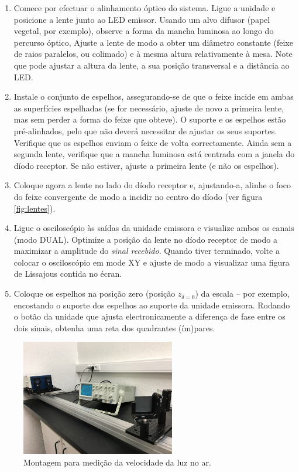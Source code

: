 \documentclass[a4paper,twoside,11pt]{report}      %
\begin{document}
\begin{enumerate}
\setlength{\itemsep}{0mm}
\item Comece por efectuar o alinhamento óptico do sistema. Ligue a unidade e posicione a lente junto ao LED emissor. Usando um alvo difusor (papel vegetal, por exemplo), observe a forma da mancha luminosa ao longo do percurso óptico, Ajuste a lente de modo a obter um diâmetro constante (feixe de raios paralelos, ou colimado) e à mesma altura relativamente à mesa. Note que pode ajustar a altura da lente, a sua posição transversal e a distância ao LED.
\item Instale o conjunto de espelhos, assegurando-se de que o feixe incide em ambas as superfícies espelhadas (se for necessário, ajuste de novo a primeira lente, mas sem perder a forma do feixe que obteve). O suporte e os espelhos estão pré-alinhados, pelo que não deverá necessitar de ajustar os seus suportes. Verifique que os espelhos enviam o feixe de volta correctamente. Ainda sem a segunda lente, verifique que a mancha luminosa está centrada com  a janela do díodo receptor. Se não estiver, ajuste a primeira lente (e não os espelhos).
\item Coloque agora a lente no lado do díodo receptor e, ajustando-a, alinhe o foco do feixe convergente de modo a incidir no centro do díodo (ver figura \ref{fig:lentes}).
\item Ligue o osciloscópio às saídas da unidade emissora e visualize ambos os canais (modo DUAL). Optimize a posição da lente no díodo receptor de modo a maximizar a amplitude do \emph{sinal recebido}. Quando tiver terminado, volte a colocar o osciloscópio em mode XY e ajuste de modo a visualizar uma figura de Lissajous contida no écran.
\item Coloque os espelhos na posição zero (posição $z_{\delta=0}$) da escala -- por exemplo, encostando o suporte dos espelhos ao suporte da unidade emissora. Rodando o botão da unidade que ajusta electronicamente a diferença de fase entre os dois sinais, obtenha uma reta dos quadrantes (ím)pares.
\end{enumerate}
 \begin{figure}[h!tb]  
	\centering 
	\includegraphics[width=0.6\textwidth]{fig6}
	\caption{Montagem para medição da velocidade da luz no ar. \label{fig:ar}} 
\end{figure}
\end{document}
